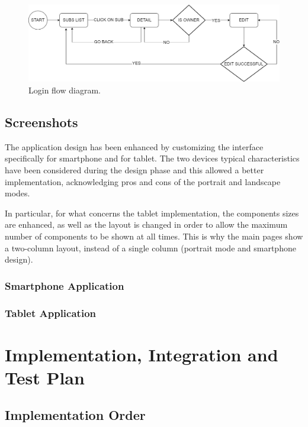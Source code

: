 \documentclass[11pt]{article}
\begin{document}
\begin{figure}[h!]
    \begin{center}
        \includegraphics[width=\textwidth, clip]{../../assets/editflow.png}
    \end{center}
    \caption{Login flow diagram.}
    \label{fig:editflow}
\end{figure}


\subsection{Screenshots}
The application design has been enhanced by customizing the interface specifically for smartphone and for tablet. The two devices typical characteristics have been considered during the design phase and this allowed a better implementation, acknowledging pros and cons of the portrait and landscape modes.

In particular, for what concerns the tablet implementation, the components sizes are enhanced, as well as the layout is changed in order to allow the maximum number of components to be shown at all times. This is why the main pages show a two-column layout, instead of a single column (portrait mode and smartphone design).

\subsubsection{Smartphone Application}

\subsubsection{Tablet Application}

\newpage
\section{Implementation, Integration and Test Plan}\label{sec:test}
\subsection{Implementation Order}
\end{document}
